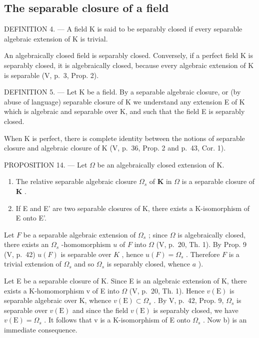\subsection{The separable closure of a field}

DEFINITION 4. --- A field K is said to be separably closed if every separable algebraic extension of K is trivial.

An algebraically closed field is separably closed. Conversely, if a perfect field K is separably closed, it is algebraically closed, because every algebraic extension of K is separable (V, p.~3, Prop. 2).

DEFINITION 5. --- Let K be a field. By a separable algebraic closure, or (by abuse of language) separable closure of K we understand any extension E of K which is algebraic and separable over K, and such that the field E is separably closed.

When K is perfect, there is complete identity between the notions of separable closure and algebraic closure of K (V, p.~36, Prop. 2 and p.~43, Cor. 1).

PROPOSITION 14. --- Let \(\Omega\) be an algebraically closed extension of K.

\begin{enumerate}
\def\labelenumi{\alph{enumi})}
\item
  The relative separable algebraic closure \(\Omega_s\) of \(\mathbf{K}\) in \(\Omega\) is a separable closure of \(\mathbf{K}\) .
\item
  If E and E' are two separable closures of K, there exists a K-isomorphism of E onto E'.
\end{enumerate}

Let \(F\) be a separable algebraic extension of \(\Omega_s\) ; since \(\Omega\) is algebraically closed, there exists an \(\Omega_s\) -homomorphism \(u\) of \(F\) into \(\Omega\) (V, p.~20, Th. 1). By Prop. 9 (V, p.~42) \(u(F)\) is separable over \(K\) , hence \(u(F) = \Omega_s\) . Therefore \(F\) is a trivial extension of \(\Omega_s\) and so \(\Omega_s\) is separably closed, whence \(a\) ).

Let E be a separable closure of K. Since E is an algebraic extension of K, there exists a K-homomorphism v of E into \(\Omega\) (V, p.~20, Th. 1). Hence \(v(\mathrm{E})\) is separable algebraic over K, whence \(v(\mathrm{E}) \subset \Omega_{s}\) . By V, p.~42, Prop. 9, \(\Omega_{s}\) is separable over \(v(\mathrm{E})\) and since the field \(v(\mathrm{E})\) is separably closed, we have \(v(\mathrm{E}) = \Omega_{s}\) . It follows that v is a K-isomorphism of E onto \(\Omega_{s}\) . Now b) is an immediate consequence.

